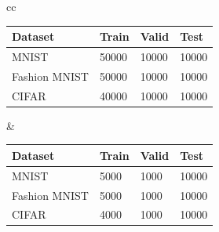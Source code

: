 \documentclass{article}
\begin{document}
\begin{tabular}{cc}
    \begin{minipage}{.5\linewidth}
\centering
\begin{tabular}{@{}llll@{}}
\toprule
\textbf{Dataset} & \textbf{Train} & \textbf{Valid} & \textbf{Test} \\ \midrule
MNIST            & 50000          & 10000          & 10000         \\
Fashion MNIST    & 50000          & 10000          & 10000         \\
CIFAR            & 40000          & 10000          & 10000         \\ \bottomrule
\end{tabular}
\label{tab:100p_data_config}
    \end{minipage} &
    \begin{minipage}{.5\linewidth}
    \centering
    \begin{tabular}{@{}llll@{}}
\toprule
\textbf{Dataset} & \textbf{Train} & \textbf{Valid} & \textbf{Test} \\ \midrule
MNIST            & 5000          & 1000          & 10000         \\
Fashion MNIST    & 5000          & 1000          & 10000         \\
CIFAR            & 4000          & 1000          & 10000         \\ \bottomrule
\end{tabular}
\label{tab:10p_data_config}
    \end{minipage} 
\end{tabular}
\end{document}
